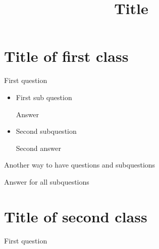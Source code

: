 \documentclass[12pt]{exam}		%
\title{Title}
\begin{document}
\section{Title of first class}
\begin{questions}
	\question First question
	
		\begin{itemize}
			\item First sub question
				\begin{solution}
					Answer
				\end{solution}
			\item Second subquestion
				\begin{solution}
    				Second answer
				\end{solution}
		\end{itemize}
	\question Another way to have questions and subquestions
		\begin{solution}
    		Answer for all subquestions
		\end{solution}
\end{questions}

\newpage
\section{Title of second class}
\begin{questions}
	\question First question
\end{questions}
				
\end{document}

